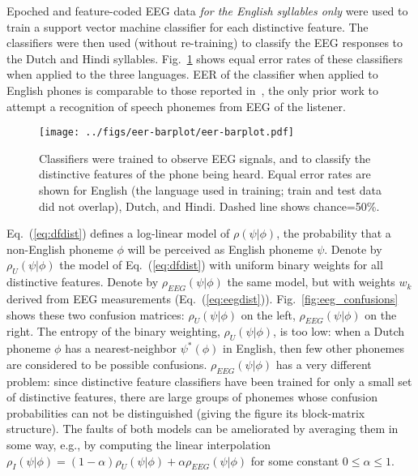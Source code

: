\label{ssec:eeg}

\newcommand{\specialcell}[2][c]{%
  \begin{tabular}[#1]{@{}c@{}}#2\end{tabular}}

Epoched and feature-coded EEG data {\em for the English syllables
only} were used to train a support vector machine classifier for each
distinctive feature.  The classifiers were then used (without
re-training) to classify the EEG responses to the Dutch and Hindi
syllables.  Fig.~\ref{fig:eeg_svm_eers} shows equal error rates of
these classifiers when applied to the three languages.  {\color{blue}
EER of the classifier when applied to English phones is comparable to
those reported in~\cite{Liberto15}, the only prior work to attempt a
recognition of speech phonemes from EEG of the listener.}

\begin{figure}
  \centerline{\texttt{[image: ../figs/eer-barplot/eer-barplot.pdf]}}
  \vspace*{-0.3cm}
  \caption{Classifiers were trained to observe EEG signals, and to
    classify the distinctive features of the phone being heard.  Equal
    error rates are shown for English (the language used in training;
    train and test data did not overlap), Dutch, and Hindi.  Dashed
    line shows chance=50\%.}
  \label{fig:eeg_svm_eers}
\end{figure}

Eq.~(\ref{eq:dfdist}) defines a log-linear model of $\rho(\psi|\phi)$,
the probability that a non-English phoneme $\phi$ will be perceived as
English phoneme $\psi$.  Denote by $\rho_U(\psi|\phi)$ the model of
Eq.~(\ref{eq:dfdist}) with uniform binary weights for all distinctive
features. Denote by $\rho_{EEG}(\psi|\phi)$ the same model, but with
weights $w_k$ derived from EEG measurements (Eq.~(\ref{eq:eegdist})).
Fig.~\ref{fig:eeg_confusions} shows these two confusion matrices:
$\rho_U(\psi|\phi)$ on the left, $\rho_{EEG}(\psi|\phi)$ on the
right. The entropy of the binary weighting, $\rho_U(\psi|\phi)$, is
too low: when a Dutch phoneme $\phi$ has a nearest-neighbor
$\psi^*(\phi)$ in English, then few other phonemes are considered to
be possible confusions.  $\rho_{EEG}(\psi|\phi)$ has a very different
problem: since distinctive feature classifiers have been trained for
only a small set of distinctive features, there are large groups of
phonemes whose confusion probabilities can not be distinguished
(giving the figure its block-matrix structure).  The faults of both
models can be ameliorated by averaging them in some way, e.g., by
computing the linear interpolation
$\rho_I(\psi|\phi)=(1-\alpha)\rho_U(\psi|\phi)+\alpha\rho_{EEG}(\psi|\phi)$
for some constant $0\le\alpha\le 1$.

